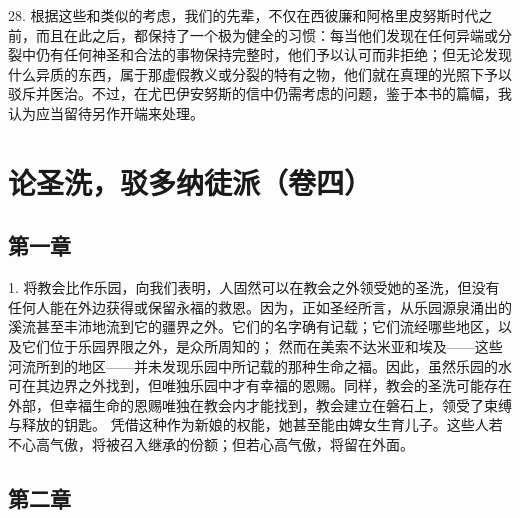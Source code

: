 28. 根据这些和类似的考虑，我们的先辈，不仅在西彼廉和阿格里皮努斯时代之前，而且在此之后，都保持了一个极为健全的习惯：每当他们发现在任何异端或分裂中仍有任何神圣和合法的事物保持完整时，他们予以认可而非拒绝；但无论发现什么异质的东西，属于那虚假教义或分裂的特有之物，他们就在真理的光照下予以驳斥并医治。不过，在尤巴伊安努斯的信中仍需考虑的问题，鉴于本书的篇幅，我认为应当留待另作开端来处理。\par



\section{论圣洗，驳多纳徒派（卷四）}

\par


\subsection{第一章}

1. 将教会比作乐园，向我们表明，人固然可以在教会之外领受她的圣洗，但没有任何人能在外边获得或保留永福的救恩。因为，正如圣经所言，从乐园源泉涌出的溪流甚至丰沛地流到它的疆界之外。它们的名字确有记载；它们流经哪些地区，以及它们位于乐园界限之外，是众所周知的； 然而在美索不达米亚和埃及——这些河流所到的地区——并未发现乐园中所记载的那种生命之福。因此，虽然乐园的水可在其边界之外找到，但唯独乐园中才有幸福的恩赐。同样，教会的圣洗可能存在外部，但幸福生命的恩赐唯独在教会内才能找到，教会建立在磐石上，领受了束缚与释放的钥匙。 凭借这种作为新娘的权能，她甚至能由婢女生育儿子。这些人若不心高气傲，将被召入继承的份额；但若心高气傲，将留在外面。\par


\subsection{第二章}

